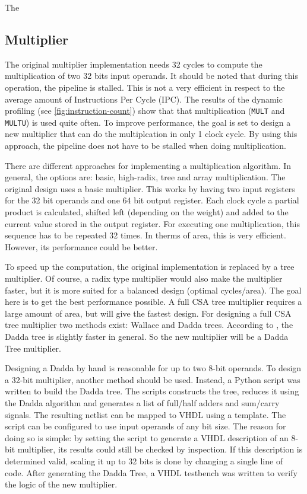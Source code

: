 \documentclass[final]{article}
\begin{document}
The 

\subsection{Multiplier}
The original multiplier implementation needs 32 cycles to compute the multiplication of two 32 bits input operands. It should be noted that during this operation, the pipeline is stalled. This is not a very efficient in respect to the average amount of Instructions Per Cycle (IPC). The results of the dynamic profiling (see \cref{fig:instruction-count}) show that that multiplication (\texttt{MULT} and \texttt{MULTU}) is used quite often. To improve performance, the goal is set to design a new multiplier that can do the multiplcation in only 1 clock cycle. By using this approach, the pipeline does not have to be stalled when doing multiplication.

There are different approaches for implementing a multiplication algorithm. In general, the options are: basic, high-radix, tree and array multiplication. The original design uses a basic multiplier. This works by having two input registers for the 32 bit operands and one 64 bit output register. Each clock cycle a partial product is calculated, shifted left (depending on the weight) and added to the current value stored in the output register. For executing one multiplication, this sequence has to be repeated 32 times. In therms of area, this is very efficient. However, its performance could be better.

To speed up the computation, the original implementation is replaced by a tree multiplier. Of course, a radix type multiplier would also make the multiplier faster, but it is more suited for a balanced design (optimal cycles/area). The goal here is to get the best performance possible. A full CSA tree multiplier requires a large amount of area, but will give the fastest design. For designing a full CSA tree multiplier two methods exist: Wallace and Dadda trees. According to \cite{townsend}, the Dadda tree is slightly faster in general. So the new multiplier will be a Dadda Tree multiplier.

Designing a Dadda by hand is reasonable for up to two 8-bit operands. To design a 32-bit multiplier, another method should be used. Instead, a Python script was written to build the Dadda tree. The scripts constructs the tree, reduces it using the Dadda algorithm and generates a list of full/half adders and sum/carry signals. The resulting netlist can be mapped to VHDL using a template. The script can be configured to use input operands of any bit size. The reason for doing so is simple: by setting the script to generate a VHDL description of an 8-bit multiplier, its results could still be checked by inspection. If this description is determined valid, scaling it up to 32 bits is done by changing a single line of code. After generating the Dadda Tree, a VHDL testbench was written to verify the logic of the new multiplier.
\end{document}
